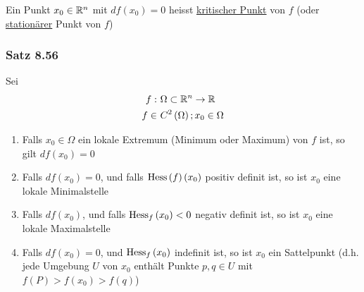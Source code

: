 \begin{definition}{8.55}
Ein Punkt $x_0\in\mathbb{R}^n$ mit $df\left( x_0\right)=0$ heisst \underline{kritischer Punkt} von $f$ (oder \underline{stationärer} Punkt von $f$)
\end{definition}

\subsubsection*{Satz 8.56}
Sei
\begin{align*}
f: &\text{ } \Omega \subset\mathbb{R}^n\to\mathbb{R}\\
f \in & \text{ }C^2\left(\Omega\right); x_0\in\Omega
\end{align*}
\begin{enumerate}
\item Falls $x_0\in\Omega$ ein lokale Extremum (Minimum oder Maximum) von $f$ ist, so gilt $df\left(x_0\right)=0$
\item Falls $df\left( x_0\right)=0$, und falls $\operatorname{Hess} \left( f\right)\left( x_0\right)$ positiv definit ist, so ist $x_0$ eine lokale Minimalstelle
\item Falls $df\left( x_0\right)$, und falls $\operatorname{Hess}_f\left( x_0\right)<0$ negativ definit ist, so ist $x_0$ eine lokale Maximalstelle
\item Falls $df\left( x_0\right)=0$, und $\operatorname{Hess}_f\left( x_0\right)$ indefinit ist, so ist $x_0$ ein Sattelpunkt (d.h. jede Umgebung $U$ von $x_0$ enthält Punkte $p,q\in U$ mit $f\left( P\right) > f\left( x_0\right)>f\left( q\right)$)
\end{enumerate}

